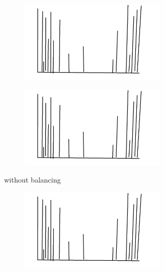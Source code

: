 \begin{figure}
	\centering
	\begin{subfigure}[b]{0.45\linewidth}
		\begin{subfigure}[b]{\linewidth}
			\includegraphics[width=\linewidth]{plots/data-distribution-placeholder.png}
		\end{subfigure}
		\begin{subfigure}[b]{\linewidth}
			\includegraphics[width=\linewidth]{plots/data-distribution-placeholder.png}
		\end{subfigure}
		\caption{without balancing}
	\end{subfigure}
	\begin{subfigure}[b]{0.45\linewidth}
		\begin{subfigure}[b]{\linewidth}
			\includegraphics[width=\linewidth]{plots/data-distribution-placeholder.png}

\end{subfigure}
\end{subfigure}
\end{figure}

